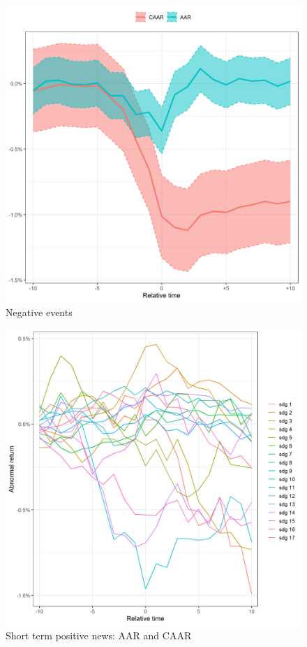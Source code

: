\begin{figure}[!tbp]
\begin{minipage}[b]{0.45\textwidth}
    \includegraphics[scale=0.45]{Projekt/1.Figures analysis/ST_negative_all_CI.png}
    \caption{Negative events}
  \end{minipage}
\end{figure}






\begin{figure}
    \centering
    \includegraphics[scale=0.6]{Projekt/1.Figures analysis/ST_positive_sdgs.png}
    \caption{Short term positive news: AAR and CAAR}
    \label{fig:ST_pos_news}
\end{figure}


